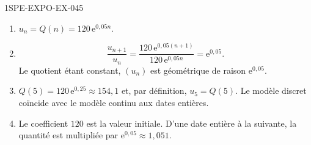 \begin{corrige}{1SPE-EXPO-EX-045}
\begin{enumerate}
\item $u_n=Q(n)=120\,\mathrm{e}^{0{,}05n}$.
\item
\[\frac{u_{n+1}}{u_n}=\frac{120\,\mathrm{e}^{0{,}05(n+1)}}{120\,\mathrm{e}^{0{,}05n}}=\mathrm{e}^{0{,}05}.\]
Le quotient étant constant, $(u_n)$ est géométrique de raison $\mathrm{e}^{0{,}05}$.
\item $Q(5)=120\,\mathrm{e}^{0{,}25}\approx154{,}1$ et, par définition, $u_5=Q(5)$. Le modèle discret coïncide avec le modèle continu aux dates entières.
\item Le coefficient $120$ est la valeur initiale. D'une date entière à la suivante, la quantité est multipliée par $\mathrm{e}^{0{,}05}\approx1{,}051$.
\end{enumerate}
\end{corrige}
